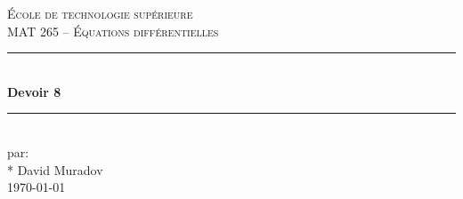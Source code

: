 \documentclass[11pt, letterpaper]{article}
\begin{document}
\begin{titlepage}
\center

\vspace*{2cm}

\textsc{\LARGE École de technologie supérieure}\\[1cm]
\textsc{\Large MAT 265 -- Équations différentielles}\\[1.5cm]

\rule{\linewidth}{0.5mm} \\[0.5cm]
{\LARGE \bfseries Devoir 8} \\[0.2cm]
\rule{\linewidth}{0.5mm} \\[3cm]

\large par: \\*
    David Muradov\\[8cm]


{\large \today }\\[3cm]

\vfill
\end{titlepage}








\end{document}
